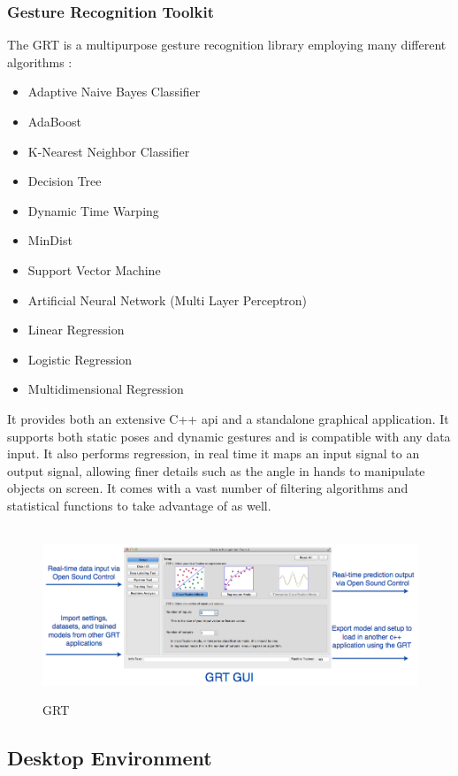 \documentclass[a4paper]{article}
\begin{document}
\subsubsection{Gesture Recognition Toolkit \label{GRT}}
The GRT is a multipurpose gesture recognition library employing many different algorithms :
\begin {itemize}
\item Adaptive Naive Bayes Classifier
\item AdaBoost
\item K-Nearest Neighbor Classifier
\item Decision Tree
\item Dynamic Time Warping
\item MinDist
\item Support Vector Machine
\item Artificial Neural Network (Multi Layer Perceptron)
\item Linear Regression
\item Logistic Regression
\item Multidimensional Regression
\end{itemize}
It provides both an extensive C++ api and a standalone graphical application. It supports both static poses and dynamic gestures and is compatible with any data input. It also performs regression, in real time it maps an input signal to an output signal, allowing finer details such as the angle in hands to manipulate objects on screen.
It comes with a vast number of filtering algorithms and statistical functions to take advantage of as well. \\ \\
\begin{figure}[!h]
\centerline{\includegraphics[width=1\textwidth]{grt.png}}
\caption{GRT}\cite{GRT}
\end{figure}
\newpage


\subsection{Desktop Environment}
\end{document}
